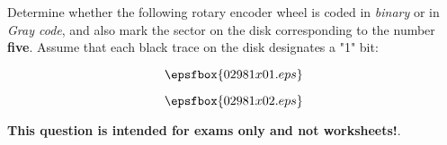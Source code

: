 

Determine whether the following rotary encoder wheel is coded in {\it binary} or in {\it Gray code}, and also mark the sector on the disk corresponding to the number {\bf five}.  Assume that each black trace on the disk designates a "1" bit:

$$\epsfbox{02981x01.eps}$$







$$\epsfbox{02981x02.eps}$$







{\bf This question is intended for exams only and not worksheets!}.





